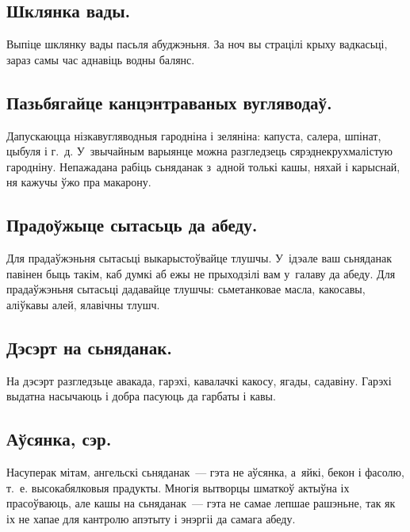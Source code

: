 \subsection{Шклянка вады.}
Выпіце шклянку вады пасьля абуджэньня. За ноч вы страцілі крыху вадкасьці, зараз самы час аднавіць водны балянс.

\subsection{Пазьбягайце канцэнтраваных вугляводаў.}
Дапускаюцца нізкавугляводныя гародніна і зеляніна: капуста, салера, шпінат, цыбуля і г.~д. У~звычайным варыянце можна разгледзець сярэднекрухмалістую гародніну. Непажадана рабіць сьняданак з~адной толькі кашы, няхай і карыснай, ня кажучы ўжо пра макарону.

\subsection{Прадоўжыце сытасьць да абеду.}
Для прадаўжэньня сытасьці выкарыстоўвайце тлушчы. У~ідэале ваш сьняданак павінен быць такім, каб думкі аб ежы не прыходзілі вам у~галаву да абеду. Для прадаўжэньня сытасьці дадавайце тлушчы: сьметанковае масла, какосавы, аліўкавы алей, ялавічны тлушч.

\subsection{Дэсэрт на сьняданак.}
На дэсэрт разгледзьце авакада, гарэхі, кавалачкі какосу, ягады, садавіну. Гарэхі выдатна насычаюць і добра пасуюць да гарбаты і кавы.

\subsection{Аўсянка, сэр.}
Насуперак мітам, ангельскі сьняданак~--- гэта не аўсянка, а~яйкі, бекон і фасолю, т.~е. высокабялковыя прадукты. Многія вытворцы шматкоў актыўна іх прасоўваюць, але кашы на сьняданак~--- гэта не самае лепшае рашэньне, так як іх не хапае для кантролю апэтыту і энэргіі да самага абеду.